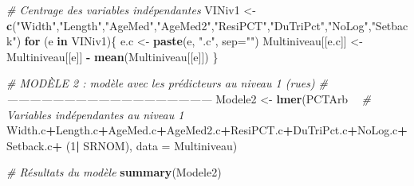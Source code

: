 \documentclass[
  11pt,
  french,
]{book}
\makeatletter
\newenvironment{Shaded}{\begin{snugshade}}{\end{snugshade}}
\newcommand{\CommentTok}[1]{\textcolor[rgb]{0.56,0.35,0.01}{\textit{#1}}}
\newcommand{\ControlFlowTok}[1]{\textcolor[rgb]{0.13,0.29,0.53}{\textbf{#1}}}
\newcommand{\DataTypeTok}[1]{\textcolor[rgb]{0.13,0.29,0.53}{#1}}
\newcommand{\DecValTok}[1]{\textcolor[rgb]{0.00,0.00,0.81}{#1}}
\newcommand{\KeywordTok}[1]{\textcolor[rgb]{0.13,0.29,0.53}{\textbf{#1}}}
\newcommand{\NormalTok}[1]{#1}
\newcommand{\OperatorTok}[1]{\textcolor[rgb]{0.81,0.36,0.00}{\textbf{#1}}}
\newcommand{\StringTok}[1]{\textcolor[rgb]{0.31,0.60,0.02}{#1}}
\newenvironment{kframe}{%
\medskip{}
\setlength{\fboxsep}{.8em}
 \def\at@end@of@kframe{}%
 \ifinner\ifhmode%
  \def\at@end@of@kframe{\end{minipage}}%
  \begin{minipage}{\columnwidth}%
 \fi\fi%
 \def\FrameCommand##1{\hskip\@totalleftmargin \hskip-\fboxsep
 \colorbox{shadecolor}{##1}\hskip-\fboxsep
     \hskip-\linewidth \hskip-\@totalleftmargin \hskip\columnwidth}%
 \MakeFramed {\advance\hsize-\width
   \@totalleftmargin\z@ \linewidth\hsize
   \@setminipage}}%
 {\par\unskip\endMakeFramed%
 \at@end@of@kframe}
\renewenvironment{Shaded}{\begin{kframe}}{\end{kframe}}
\makeatother
\begin{document}
\begin{Shaded}
\begin{Highlighting}[]
\CommentTok{# Centrage des variables indépendantes}
\NormalTok{VINiv1 <-}\StringTok{ }\KeywordTok{c}\NormalTok{(}\StringTok{"Width"}\NormalTok{,}\StringTok{"Length"}\NormalTok{,}\StringTok{"AgeMed"}\NormalTok{,}\StringTok{"AgeMed2"}\NormalTok{,}\StringTok{"ResiPCT"}\NormalTok{,}\StringTok{"DuTriPct"}\NormalTok{,}\StringTok{"NoLog"}\NormalTok{,}\StringTok{"Setback"}\NormalTok{)}
\ControlFlowTok{for}\NormalTok{ (e }\ControlFlowTok{in}\NormalTok{ VINiv1)\{}
\NormalTok{  e.c <-}\StringTok{ }\KeywordTok{paste}\NormalTok{(e, }\StringTok{".c"}\NormalTok{, }\DataTypeTok{sep=}\StringTok{""}\NormalTok{)}
\NormalTok{  Multiniveau[[e.c]] <-}\StringTok{ }\NormalTok{Multiniveau[[e]] }\OperatorTok{-}\StringTok{ }\KeywordTok{mean}\NormalTok{(Multiniveau[[e]])}
\NormalTok{\}}

\CommentTok{# MODÈLE 2 : modèle avec les prédicteurs au niveau 1 (rues) }
\CommentTok{# ------------------------------------------------------}
\NormalTok{Modele2 <-}\StringTok{ }\KeywordTok{lmer}\NormalTok{(PCTArb }\OperatorTok{~}
\StringTok{                  }\CommentTok{# Variables indépendantes au niveau 1}
\StringTok{                   }\NormalTok{Width.c}\OperatorTok{+}\NormalTok{Length.c}\OperatorTok{+}\NormalTok{AgeMed.c}\OperatorTok{+}\NormalTok{AgeMed2.c}\OperatorTok{+}\NormalTok{ResiPCT.c}\OperatorTok{+}\NormalTok{DuTriPct.c}\OperatorTok{+}\NormalTok{NoLog.c}\OperatorTok{+}\NormalTok{Setback.c}\OperatorTok{+}
\StringTok{                   }\NormalTok{(}\DecValTok{1}\OperatorTok{|}\StringTok{ }\NormalTok{SRNOM), }\DataTypeTok{data =}\NormalTok{ Multiniveau)}

\CommentTok{# Résultats du modèle}
\KeywordTok{summary}\NormalTok{(Modele2)}
\end{Highlighting}
\end{Shaded}
\end{document}
